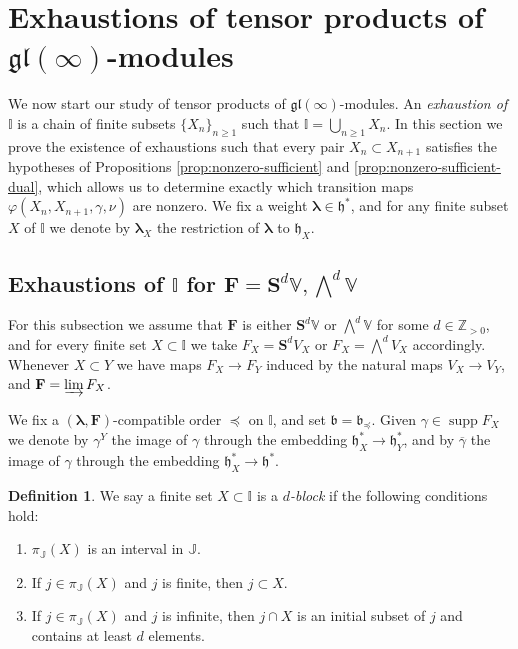 \documentclass[11pt,fleqn]{amsart}
\newcommand\ZZ{\mathbb Z}
\newcommand\II{\mathbb I}
\newcommand\JJ{\mathbb J}
\renewcommand\to{\longrightarrow}
\renewcommand\phi{\varphi}
\theoremstyle{definition}
\newtheorem{defn}[thm]{Definition}
\theoremstyle{remark}
\theoremstyle{remark}
\newcommand\VV{\mathbb V}
\newcommand\gl{\mathfrak{gl}}
\renewcommand\SS{\mathbf S}
\newcommand\lie[1]{\mathfrak{#1}}
\newcommand\wt[1]{\boldsymbol{#1}}
\DeclareMathOperator\supp{supp}
\newcommand\map[4]{\phi(#3,#4,#1,#2)}
\begin{document}
\section{Exhaustions of tensor products of $\gl(\infty)$-modules}

We now start our study of tensor products of $\gl(\infty)$-modules. 
An \emph{exhaustion of $\II$} is a chain of finite subsets $\{X_n\}_{n\geq 1}$ 
such that $\II = \bigcup_{n\geq 1} X_n$. In this section we prove the existence 
of exhaustions such that every pair $X_n \subset X_{n+1}$ satisfies the 
hypotheses of Propositions \ref{prop:nonzero-sufficient} and 
\ref{prop:nonzero-sufficient-dual}, which allows us to determine exactly which 
transition maps $\map{\gamma}{\nu}{X_n}{X_{n+1}}$ are nonzero.
We fix a weight $\wt\lambda \in \lie h^*$,
and for any finite subset $X$ of $\II$ we denote by $\wt\lambda_X$ the 
restriction of $\wt\lambda$ to $\lie h_X$.

\subsection{Exhaustions of $\II$ for $\mathbf F = \SS^d\VV, \bigwedge^d \VV$}
\label{ss:tensor-setup}
For this subsection we assume that $\mathbf F$ is either $\SS^d\VV$ or 
$\bigwedge^d\VV$ for some $d \in \ZZ_{>0}$, and for every finite set $X 
\subset \II$ we take $F_X = \SS^dV_X$ or $F_X = \bigwedge^d V_X$ accordingly.
Whenever $X \subset Y$ we have maps $F_X \to F_Y$ induced by the natural maps 
$V_X \to V_Y$, and $\mathbf F = \varinjlim F_X$. 

We fix a $(\wt\lambda,\mathbf F)$-compatible order $\preceq$ on $\II$, and set 
$\lie b = \lie b_{\preceq}$. Given $\gamma \in \supp F_X$ we denote by 
$\gamma^Y$ the image of $\gamma$ through the embedding $\lie h_X^* \to \lie 
h_Y^*$, and by $\overline{\gamma}$ the image of $\gamma$ through 
the embedding $\lie h_X^* \to \lie h^*$.

\begin{defn}
We say a finite set $X \subset \II$ is a \emph{$d$-block} if the following 
conditions hold:
\begin{enumerate}
  \item $\pi_\JJ(X)$ is an interval in $\JJ$.
  \item If $j \in \pi_{\JJ}(X)$ and $j$ is finite, then $j \subset X$.
  \item If $j \in \pi_{\JJ}(X)$ and $j$ is infinite, then $j \cap X$ is an
    initial subset of $j$ and contains at least $d$ elements.
\end{enumerate}
\end{defn}
\end{document}
